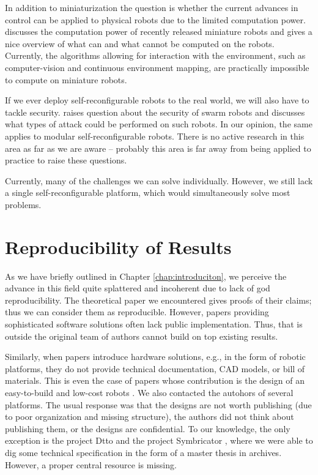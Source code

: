In addition to miniaturization the question is whether the current advances in
control can be applied to physical robots due to the limited computation power.
\textcite{DBLP:journals/ral/Trenkwalder19} discusses the computation power of
recently released miniature robots and gives a nice overview of what can and
what cannot be computed on the robots. Currently, the algorithms allowing for
interaction with the environment, such as computer-vision and continuous
environment mapping, are practically impossible to compute on miniature robots.

If we ever deploy self-reconfigurable robots to the real world, we will also
have to tackle security. \textcite{DBLP:conf/icas/HigginsTM09} raises question
about the security of swarm robots and discusses what types of attack could be
performed on such robots. In our opinion, the same applies to modular
self-reconfigurable robots. There is no active research in this area as far as
we are aware -- probably this area is far away from being applied to practice to
raise these questions.

Currently, many of the challenges we can solve individually. However, we still
lack a single  self-reconfigurable platform, which would
simultaneously solve most problems.

\section{Reproducibility of Results}\label{sec:reproducibility}

As we have briefly outlined in Chapter \ref{chap:introduciton}, we perceive the
advance in this field quite splattered and incoherent due to lack of god
reproducibility. The theoretical paper we encountered gives proofs of their
claims; thus we can consider them as reproducible. However, papers providing
sophisticated software solutions often lack public implementation. Thus, that
is outside the original team of authors cannot build on top existing results.

Similarly, when papers introduce hardware solutions, e.g., in the form of
robotic platforms, they do not provide technical documentation, CAD models, or
bill of materials. This is even the case of papers whose contribution is the
design of an easy-to-build and low-cost robots \cite{DBLP:conf/robio/YuLW17}. We
also contacted the autohors of several platforms. The usual response was that
the designs are not worth publishing (due to poor organization and missing
structure), the authors did not think about publishing them, or the designs are
confidential. To our knowledge, the only exception is the project Dtto
\cite{otrebla333} and the project Symbricator
\cite{DBLP:journals/corr/abs-1109-2288}, where we were able to dig some
technical specification in the form of a master thesis in archives. However,
a proper central resource is missing.